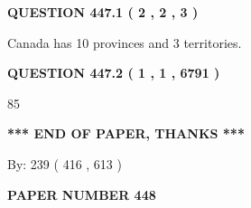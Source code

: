 \documentclass[12pt]{article}
\begin{document}
   
   
   
 \vspace{0.2in}
 
 
 
 
   
   
  
\vspace{0.2in}
  
{\textbf{\Large{QUESTION
447.1 
 ( 2 , 2 , 3 )
}}}
  
  
 
 
\noindent{}
 
 
Canada has 10  provinces and 3 territories.
 
 
 
 
  
\vspace{0.2in}
  
{\textbf{\Large{QUESTION
447.2 
 ( 1 , 1 , 6791 )
}}}
  
  
 
 
\noindent{}

85
 
 
   
   
 \vspace{0.2in}
 
   
   
   
   
\vspace{1.0in} 
{\textbf{\large{ *** END OF PAPER, THANKS *** }}} 
   
   
\hspace{1.0in} By: 
 239 ( 416 ,  613 )
   
   
   
   
\newpage 
\setcounter{page}{ 
   448001 } 
   
   
   
   
 {\textbf{ \Large{ PAPER NUMBER  448  }}}
   
   
\vspace{0.2in}
   
   
   
   
   
   
 \vspace{0.2in}
 
 
 
 
   
\end{document}
